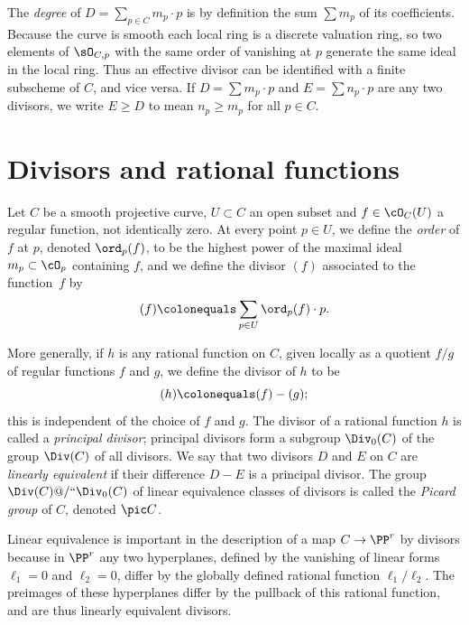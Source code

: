 The \emph{degree} of  $D = \sum_{p\in C} m_p\cdot p$ is by definition
%
the sum $\sum m_p$ of its coefficients. Because the curve is smooth
each local ring is a discrete valuation ring, so two elements of
$\sO_{C,p}$ with the same order of vanishing at $p$ generate the same ideal in the local ring. Thus an effective divisor
can be identified with a finite subscheme of $C$, and vice versa. If $D = \sum m_p\cdot p$ and $E = \sum n_p\cdot p$ are any two divisors, we write $E \geq D$ to mean $n_p \geq m_p$ for all $p \in C$.


\section{Divisors and rational functions}

Let $C$ be a smooth projective curve, $U \subset C$ an open subset and
$f \in \cO_C(U)$ a regular function, not identically zero. At every
point $p \in U$, we define the \emph{order} of $f$ at $p$, denoted
%
$\ord_p(f)$,
to be the highest power of the maximal ideal $m_p \subset
\cO_p$ containing $f$, and we define the divisor $(f)$ associated to
%
the function~$f$ by
$$
(f) \colonequals \sum_{p \in U} \ord_p(f) \cdot p.
$$

More generally, if $h$ is any rational function on $C$, given locally as a quotient $f/g$ of regular functions $f$ and $g$, we define the divisor of $h$ to be
$$
(h) \colonequals (f) - (g);
$$
%
this is independent of the choice of $f$ and $g$. The divisor of a
%
rational function $h$ is called a \emph{principal divisor}; principal
divisors form a subgroup $\Div_0(C)$ of the group $\Div(C)$ of all
divisors. We say that two divisors $D$ and $E$ on $C$ are
\emph{linearly equivalent} if their difference $D-E$ is a principal
divisor. The group $\Div(C)@/` `\Div_0(C)$ of linear equivalence classes
%
of divisors is called the \emph{Picard group} of $C$, denoted
%
$\pic C$.

Linear equivalence
%
is important in the description of a map $C\to \PP^{r}$ by divisors
because in $\PP^{r}$ any two hyperplanes, defined by the vanishing of linear forms  $\ell_{1}=0$ and $\ell_{2}=0$, differ by the globally defined rational
function $\ell_{1}/\ell_{2}$. The preimages of these hyperplanes
differ by the
pullback of this rational function,
and are thus linearly equivalent divisors.

